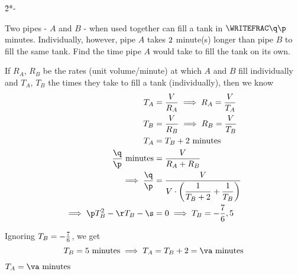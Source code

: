 

\ADD\vb\vd\va
{}\vb\p\q
\EXPR[0]\r{2*\q-\vd*\p}
\MULTIPLY\vd\q\s

\question[4] Two pipes - $A$ and $B$ - when used together can fill a tank in $\WRITEFRAC\q\p$ minutes.
Individually, however, pipe $A$ takes $2$ minute(s) longer than pipe $B$ to fill the same
tank. Find the time pipe $A$ would take to fill the tank on its own. 

\watchout


\begin{solution}[\fullpage]
	If $R_A$, $R_B$ be the rates (unit volume/minute) at which $A$ and $B$ fill individually
	and $T_A$, $T_B$ the times they take to fill a tank (individually), then we know
	\begin{align}
		T_A &= \dfrac{V}{R_A} \implies R_A = \dfrac{V}{T_A}\\
		T_B &= \dfrac{V}{R_B} \implies R_B = \dfrac{V}{T_B}\\
		T_A &= T_B + \vd\text{ minutes} \\
		\dfrac\q\p\text{ minutes} &= \dfrac{V}{R_A + R_B} \\
		\implies\dfrac\q\p &= \dfrac{V}{V\cdot\left(\dfrac{1}{T_B + \vd} + \dfrac{1}{T_B}\right)} \\
		\implies \p T_B^2 - \r T_B - \s &= 0\implies T_B = \vx,\vb
	\end{align}
	
	Ignoring $T_B = -\frac{7}{6}$, we get 
  \[ T_B = \vb\text{ minutes} \implies T_A = T_B + \vd = \va\text{ minutes} \]
\end{solution}

\ifprintanswers\begin{codex}$T_A=\va\text{ minutes}$\end{codex}\fi
